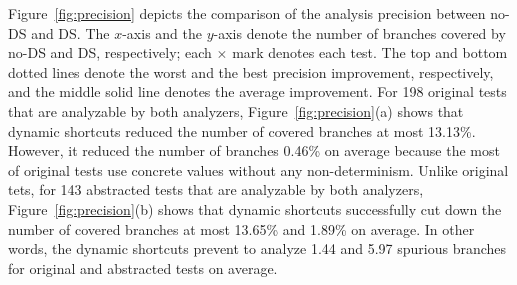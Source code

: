 Figure~\ref{fig:precision} depicts the comparison of the analysis
precision between no-DS and DS.  The $x$-axis and the $y$-axis denote
the number of branches covered by no-DS and DS, respectively;
each $\times$ mark denotes each test.  The top and bottom dotted lines
denote the worst and the best precision improvement, respectively, and
the middle solid line denotes the average improvement.
For 198 original tests that are analyzable by both analyzers,
Figure~\ref{fig:precision}(a) shows that dynamic shortcuts
reduced the number of covered branches at most 13.13\%. However, it reduced
the number of branches 0.46\% on average because the most of original tests
use concrete values without any non-determinism. Unlike original tets, for 143
abstracted tests that are analyzable by both analyzers,
Figure~\ref{fig:precision}(b) shows that dynamic shortcuts successfully cut down
the number of covered branches at most 13.65\% and 1.89\% on average.  In other
words, the dynamic shortcuts prevent to analyze 1.44 and 5.97 spurious branches
for original and abstracted tests on average.
